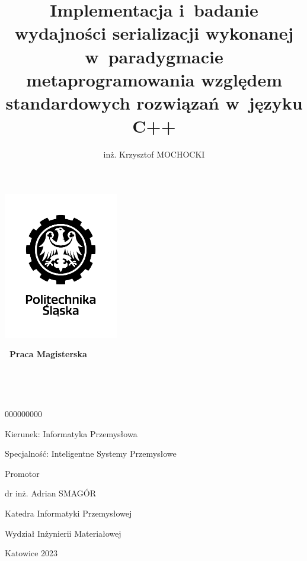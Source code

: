\documentclass[12pt]{article}
\title{Implementacja i~badanie wydajności serializacji wykonanej w~paradygmacie metaprogramowania względem standardowych rozwiązań w~języku C++}
\author{inż. Krzysztof MOCHOCKI}
\date{}
\begin{document}
	\renewcommand*\listfigurename{}
	\renewcommand*\listoftables{}

	\begin{titlepage}
		\clearpage
		\centering

		\includegraphics[width=5cm, keepaspectratio=true]{./img/black_and_white_polsl_logo.png}

		{\LARGE\bfseries\ Praca Magisterska}

		\vspace*{1cm}

		{\LARGE \MyTitle}

		\Large\bfseries\

		\begin{spacing}{1.125}
			\MyAuthor\

			000000000
			\vspace*{1cm}

			Kierunek: Informatyka Przemysłowa

			Specjalność: Inteligentne Systemy Przemysłowe

			\vspace*{1cm}

			Promotor

			dr inż. Adrian SMAGÓR

			\vspace*{0.5cm}

			Katedra Informatyki Przemysłowej

			Wydział Inżynierii Materiałowej

			\vspace*{\vfill}

			Katowice 2023
		\end{spacing}

		\thispagestyle{empty}
	\end{titlepage}
\end{document}
